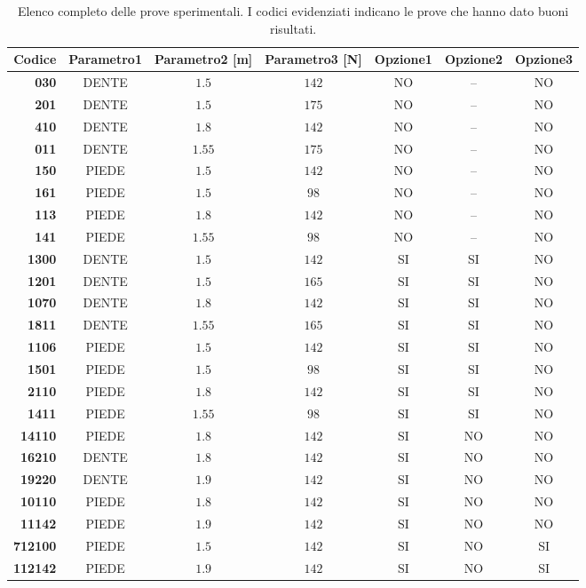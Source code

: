 \begin{sidewaystable}
%
\caption[Elenco completo delle prove sperimentali]{Elenco completo delle prove sperimentali. I {\color{webbrown} codici evidenziati} indicano le prove che hanno dato buoni risultati.}
%
\label{tab:sidewaystable}
%
\centering
%
\begin{tabular}{>{\bfseries}r c c c c c c}
%
\toprule
%
\textbf{Codice} & %
	\textbf{Parametro1}	& \textbf{Parametro2 [m]}	 & \textbf{Parametro3 [N]} %
							& \textbf{Opzione1} %
									& \textbf{Opzione2} %
											& \textbf{Opzione3}\\ 
%
\midrule
%
030  	& DENTE		& $1.5$		& $142$ 	& NO	& --	& NO\\ 
%
{\color{webbrown} 201}  	& DENTE		& $1.5$		& $175$ 	& NO	& --	& NO\\ 
%
410  	& DENTE		& $1.8$		& $142$ 	& NO	& --	& NO\\ 
%
{\color{webbrown} 011}  	& DENTE		& $1.55$		& $175$ 	& NO	& --	& NO\\ 
%
150  	& PIEDE		& $1.5$		& $142$ 	& NO	& --	& NO\\ 
%
{\color{webbrown} 161}  	& PIEDE		& $1.5$		& $98$ 	& NO	& --	& NO\\ 
%
113 	& PIEDE		& $1.8$		& $142$ 	& NO	& --	& NO\\ 
%
{\color{webbrown} 141}  	& PIEDE		& $1.55$		& $98$ 	& NO	& --	& NO\\ 
%
\midrule
%
{\color{webbrown} 1300}  	& DENTE		& $1.5$		& $142$ 		& SI 	& SI 	& NO\\
%
1201  	& DENTE		& $1.5$		& $165$ 		& SI 	& SI 	& NO\\
%
{\color{webbrown} 1070}  	& DENTE		& $1.8$		& $142$ 		& SI 	& SI 	& NO\\
%
1811  	& DENTE		& $1.55$		& $165$ 		& SI 	& SI 	& NO\\
%
{\color{webbrown} 1106}  	& PIEDE		& $1.5$		& $142$ 		& SI 	& SI 	& NO\\
%
1501  	& PIEDE		& $1.5$		& $98$ 		& SI 	& SI 	& NO\\
%
{\color{webbrown} 2110}  	& PIEDE		& $1.8$		& $142$ 		& SI 	& SI 	& NO\\
%
1411  	& PIEDE		& $1.55$		& $98$ 		& SI 	& SI 	& NO\\
%
\midrule
%
14110  	& PIEDE		& $1.8$		& $142$ 		& SI 	& NO 	& NO\\
%
16210  	& DENTE		& $1.8$		& $142$ 		& SI 	& NO 	& NO\\
%
19220  	& DENTE		& $1.9$		& $142$ 		& SI 	& NO 	& NO\\
%
10110  	& PIEDE		& $1.8$		& $142$ 		& SI 	& NO 	& NO\\
%
11142  	& PIEDE		& $1.9$		& $142$ 		& SI 	& NO 	& NO\\
%
\midrule
%
{\color{webbrown} 712100}  	& PIEDE		& $1.5$		& $142$ 		& SI 	& NO	& SI\\
%
112142  	& PIEDE		& $1.9$		& $142$ 		& SI 	& NO	& SI\\
%
\bottomrule 
%
\end{tabular}
%
\end{sidewaystable}
%

